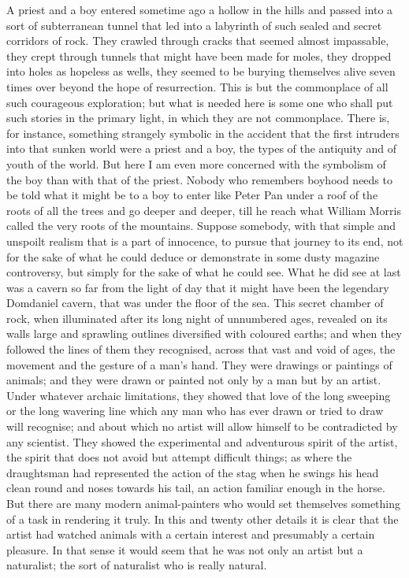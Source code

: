 A priest and a boy entered sometime ago a hollow in the hills and passed into a sort of subterranean tunnel that led into a labyrinth of such sealed and secret corridors of rock. They crawled through cracks that seemed almost impassable, they crept through tunnels that might have been made for moles, they dropped into holes as hopeless as wells, they seemed to be burying themselves alive seven times over beyond the hope of resurrection. This is but the commonplace of all such courageous exploration; but what is needed here is some one who shall put such stories in the primary light, in which they are not commonplace. There is, for instance, something strangely symbolic in the accident that the first intruders into that sunken world were a priest and a boy, the types of the antiquity and of youth of the world. But here I am even more concerned with the symbolism of the boy than with that of the priest. Nobody who remembers boyhood needs to be told what it might be to a boy to enter like Peter Pan under a roof of the roots of all the trees and go deeper and deeper, till he reach what William Morris called the very roots of the mountains. Suppose somebody, with that simple and unspoilt realism that is a part of innocence, to pursue that journey to its end, not for the sake of what he could deduce or demonstrate in some dusty magazine controversy, but simply for the sake of what he could see. What he did see at last was a cavern so far from the light of day that it might have been the legendary Domdaniel cavern, that was under the floor of the sea. This secret chamber of rock, when illuminated after its long night of unnumbered ages, revealed on its walls large and sprawling outlines diversified with coloured earths; and when they followed the lines of them they recognised, across that vast and void of ages, the movement and the gesture of a man's hand. They were drawings or paintings of animals; and they were drawn or painted not only by a man but by an artist. Under whatever archaic limitations, they showed that love of the long sweeping or the long wavering line which any man who has ever drawn or tried to draw will recognise; and about which no artist will allow himself to be contradicted by any scientist. They showed the experimental and adventurous spirit of the artist, the spirit that does not avoid but attempt difficult things; as where the draughtsman had represented the action of the stag when he swings his head clean round and noses towards his tail, an action familiar enough in the horse. But there are many modern animal-painters who would set themselves something of a task in rendering it truly. In this and twenty other details it is clear that the artist had watched animals with a certain interest and presumably a certain pleasure. In that sense it would seem that he was not only an artist but a naturalist; the sort of naturalist who is really natural.

